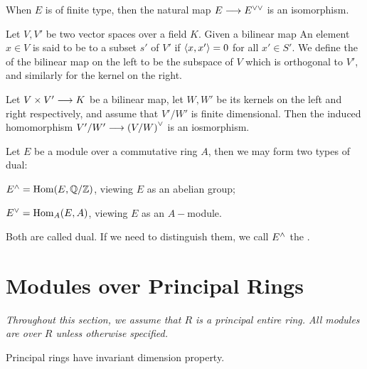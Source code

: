   \begin{cor}
    When $E$ is of finite type, then the natural map $E\longrightarrow E^{\vee\vee}$ is an isomorphism.
  \end{cor}

  \begin{defn}
    Let $V,V'$ be two vector spaces over a field $K$. Given a bilinear map
    An element $x\in V$ is said to be  to a subset $s'$ of $V'$ if $\langle x,x'\rangle=0$ for all $x'\in S'$. We define the  of the bilinear map on the left to be the subspace of $V$ which is orthogonal to $V'$, and similarly for the kernel on the right.
  \end{defn}
  \begin{thm}
    Let $V\times V'\longrightarrow K$ be a bilinear map, let $W,W'$ be its kernels on the left and right respectively, and assume that $V'/W'$ is finite dimensional. Then the induced homomorphism $V'/W'\longrightarrow{(V/W)}^{\vee}$ is an iosmorphism.
  \end{thm}

  \begin{rem}
    Let $E$ be a module over a commutative ring $A$, then we may form two types of dual:

    ${E}^{\wedge}=\operatorname{Hom}(E,{\mathbb Q}/{\mathbb Z})$, viewing $E$ as an abelian group;

    ${E}^{\vee}=\operatorname{Hom}_A(E,A)$, viewing $E$ as an $A-$module.

    Both are called dual. If we need to distinguish them, we call ${E}^{\wedge}$ the .
  \end{rem}

\newpage\section{Modules over Principal Rings}
  \emph{Throughout this section, we assume that $R$ is a principal entire ring. All modules are over $R$ unless otherwise specified.}

  \begin{prop}
    Principal rings have invariant dimension property.
  \end{prop}

